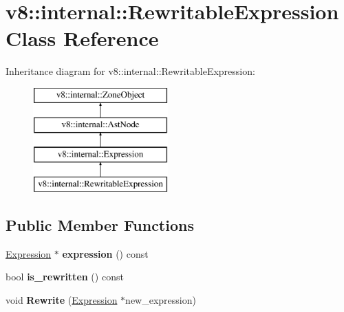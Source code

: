 \hypertarget{classv8_1_1internal_1_1_rewritable_expression}{}\section{v8\+:\+:internal\+:\+:Rewritable\+Expression Class Reference}
\label{classv8_1_1internal_1_1_rewritable_expression}
Inheritance diagram for v8\+:\+:internal\+:\+:Rewritable\+Expression\+:\begin{figure}[H]
\begin{center}
\leavevmode
\includegraphics[height=4.000000cm]{classv8_1_1internal_1_1_rewritable_expression}
\end{center}
\end{figure}
\subsection*{Public Member Functions}
\begin{DoxyCompactItemize}
\item 
\hyperlink{classv8_1_1internal_1_1_expression}{Expression} $\ast$ {\bfseries expression} () const \hypertarget{classv8_1_1internal_1_1_rewritable_expression_aadf9b695bf7c99b1d18176a9365ad2ce}{}\label{classv8_1_1internal_1_1_rewritable_expression_aadf9b695bf7c99b1d18176a9365ad2ce}

\item 
bool {\bfseries is\+\_\+rewritten} () const \hypertarget{classv8_1_1internal_1_1_rewritable_expression_a8b5d8cbdbf3d8e9d830f5da9510bd0eb}{}\label{classv8_1_1internal_1_1_rewritable_expression_a8b5d8cbdbf3d8e9d830f5da9510bd0eb}

\item 
void {\bfseries Rewrite} (\hyperlink{classv8_1_1internal_1_1_expression}{Expression} $\ast$new\+\_\+expression)\hypertarget{classv8_1_1internal_1_1_rewritable_expression_a2744f514c195a457042541d64562ef50}{}\label{classv8_1_1internal_1_1_rewritable_expression_a2744f514c195a457042541d64562ef50}

\end{DoxyCompactItemize}
